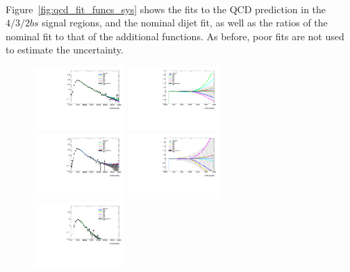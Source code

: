 \paragraph{}
Figure~\ref{fig:qcd_fit_funcs_sys} shows the fits to the QCD prediction in the $4/3/2bs$ signal regions, and the nominal dijet fit, as well as the ratios of the nominal fit to that of the additional functions.
As before, poor fits are not used to estimate the uncertainty.

\begin{figure}[htbp!]
\begin{center}
\includegraphics[width=0.31\textwidth,angle=-90]{figures/boosted/Syst_Smooth/smoothFuncCompare_22_comp.pdf}
\includegraphics[width=0.31\textwidth,angle=-90]{figures/boosted/Syst_Smooth/smoothFuncCompare_22_comp_ratio.pdf} \\
\includegraphics[width=0.31\textwidth,angle=-90]{figures/boosted/Syst_Smooth/smoothFuncCompare_33_comp.pdf}
\includegraphics[width=0.31\textwidth,angle=-90]{figures/boosted/Syst_Smooth/smoothFuncCompare_33_comp_ratio.pdf} \\
\includegraphics[width=0.31\textwidth,angle=-90]{figures/boosted/Syst_Smooth/smoothFuncCompare_44_comp.pdf}

\end{center}
\end{figure}
